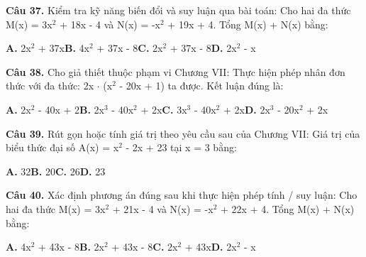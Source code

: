 \documentclass[11pt,a4paper]{article}
\begin{document}
\textbf{\color{primary} Câu 37.} Kiểm tra kỹ năng biến đổi và suy luận qua bài toán: Cho hai đa thức M(x) = 3x$^2$ + 18x - 4 và N(x) = -x$^2$ + 19x + 4. Tổng M(x) + N(x) bằng:\par
\hspace*{1.5em}\textbf{A.} 2x$^2$ + 37x\quad\quad \textbf{B.} 4x$^2$ + 37x - 8\quad\quad \textbf{C.} 2x$^2$ + 37x - 8\quad\quad \textbf{D.} 2x$^2$ - x\par\vspace{2pt}
\textbf{\color{primary} Câu 38.} Cho giả thiết thuộc phạm vi Chương VII: Thực hiện phép nhân đơn thức với đa thức: 2x $\cdot$ (x$^2$ - 20x + 1) ta được. Kết luận đúng là:\par
\hspace*{1.5em}\textbf{A.} 2x$^2$ - 40x + 2\quad\quad \textbf{B.} 2x$^3$ - 40x$^2$ + 2x\quad\quad \textbf{C.} 3x$^3$ - 40x$^2$ + 2x\quad\quad \textbf{D.} 2x$^3$ - 20x$^2$ + 2x\par\vspace{2pt}
\textbf{\color{primary} Câu 39.} Rút gọn hoặc tính giá trị theo yêu cầu sau của Chương VII: Giá trị của biểu thức đại số A(x) = x$^2$ - 2x + 23 tại x = 3 bằng:\par
\hspace*{1.5em}\textbf{A.} 32\quad\quad \textbf{B.} 20\quad\quad \textbf{C.} 26\quad\quad \textbf{D.} 23\par\vspace{2pt}
\textbf{\color{primary} Câu 40.} Xác định phương án đúng sau khi thực hiện phép tính / suy luận: Cho hai đa thức M(x) = 3x$^2$ + 21x - 4 và N(x) = -x$^2$ + 22x + 4. Tổng M(x) + N(x) bằng:\par
\hspace*{1.5em}\textbf{A.} 4x$^2$ + 43x - 8\quad\quad \textbf{B.} 2x$^2$ + 43x - 8\quad\quad \textbf{C.} 2x$^2$ + 43x\quad\quad \textbf{D.} 2x$^2$ - x\par\vspace{2pt}
\end{document}
